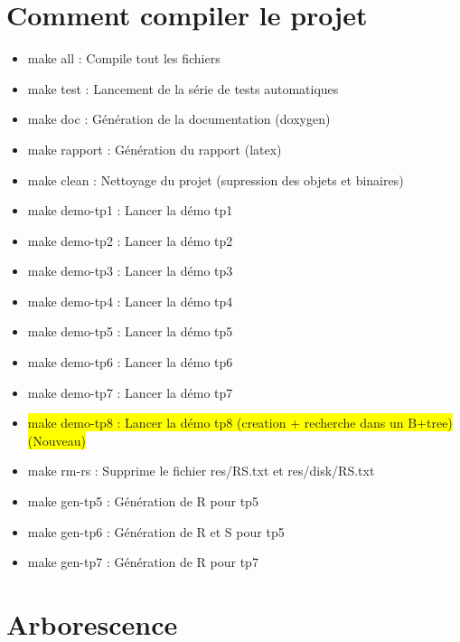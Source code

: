\documentclass[a4paper]{article}
\begin{document}
\section{Comment compiler le projet}

\begin{itemize}
	\item make all : Compile tout les fichiers
	\item make test : Lancement de la série de tests automatiques
	\item make doc  : Génération de la documentation (doxygen)
	\item make rapport : Génération du rapport (latex)
	\item make clean : Nettoyage du projet (supression des objets et binaires)
	\item make demo-tp1 : Lancer la démo tp1
	\item make demo-tp2 : Lancer la démo tp2
	\item make demo-tp3 : Lancer la démo tp3
	\item make demo-tp4 : Lancer la démo tp4
	\item make demo-tp5 : Lancer la démo tp5
  \item make demo-tp6 : Lancer la démo tp6
  \item make demo-tp7 : Lancer la démo tp7
  \item \colorbox{yellow}{ make demo-tp8 : Lancer la démo tp8 (creation + recherche dans un B+tree) (Nouveau)}
	\item make rm-rs : Supprime le fichier res/RS.txt et res/disk/RS.txt
  \item make gen-tp5 : Génération de R pour tp5
  \item make gen-tp6 : Génération de R et S pour tp5
  \item make gen-tp7 : Génération de R pour tp7
\end{itemize}

\section{Arborescence}
\end{document}

